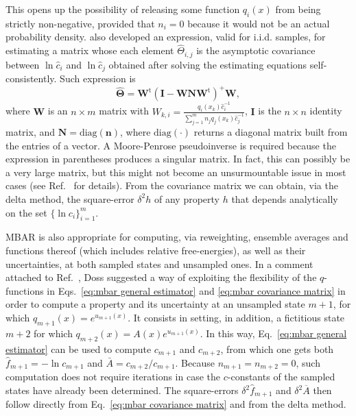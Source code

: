 \documentclass[journal=jctcce,manuscript=article]{achemso}
\newcommand{\mt}[1]{\boldsymbol{\mathbf{#1}}}   %
\newcommand{\vt}[1]{\boldsymbol{\mathbf{#1}}}   %
\newcommand{\tr}[1]{#1^\text{t}}                %
\newcommand{\avg}[1]{\overline{#1}}             %
\begin{document}
This opens up the possibility of releasing some function $q_i(x)$ from being strictly non-negative, provided that $n_i = 0$ because it would not be an actual probability density. \citeauthor{Kong_2003} \cite{Kong_2003} also developed an expression, valid for i.i.d. samples, for estimating a matrix whose each element $\hat \Theta_{i,j}$ is the asymptotic covariance between $\ln \hat c_i$ and $\ln \hat c_j$ obtained after solving the estimating equations self-consistently. Such expression is
\begin{equation}
\label{eq:mbar covariance matrix}
\hat{\mt \Theta} = \tr{\mt W} (\mt I - {\mt W}{\mt N}\tr{\mt W})^+  {\mt W},
\end{equation}
where $\mt W$ is an $n \times m$ matrix with $W_{k,i} = \frac{q_i(x_k) \hat c_i^{-1}}{\sum_{j=1}^m n_j q_j(x_k) \hat c_j^{-1}}$, $\mt I$ is the $n \times n$ identity matrix, and $\mt N = \text{diag}(\vt n)$, where $\text{diag}(\cdot)$ returns a diagonal matrix built from the entries of a vector. A Moore-Penrose pseudoinverse is required because the expression in parentheses produces a singular matrix. In fact, this can possibly be a very large matrix, but this might not become an unsurmountable issue in most cases (see Ref.~ for details). From the covariance matrix we can obtain, via the delta method, the square-error $\delta^2 h$ of any property $h$ that depends analytically on the set $\{\ln c_i\}_{i=1}^m$.

MBAR is also appropriate for computing, via reweighting, ensemble averages and functions thereof (which includes relative free-energies), as well as their uncertainties, at both sampled states and unsampled ones. In a comment attached to Ref.~, Doss suggested a way of exploiting the flexibility of the $q$-functions in Eqs.~\eqref{eq:mbar general estimator} and \eqref{eq:mbar covariance matrix} in order to compute a property and its uncertainty at an unsampled state $m+1$, for which $q_{m+1}(x) = e^{u_{m+1}(x)}$. It consists in setting, in addition, a fictitious state $m+2$ for which $q_{m+2}(x) = A(x)e^{u_{m+1}(x)}$. In this way, Eq.~\eqref{eq:mbar general estimator} can be used to compute $c_{m+1}$ and $c_{m+2}$, from which one gets both $\hat f_{m+1} = -\ln c_{m+1}$ and $\bar A = {c_{m+2}}/{c_{m+1}}$. Because $n_{m+1} = n_{m+2} = 0$, such computation does not require iterations in case the $c$-constants of the sampled states have already been determined. The square-errors $\delta^2 \hat f_{m+1}$ and $\delta^2 \avg A$ then follow directly from Eq.~\eqref{eq:mbar covariance matrix} and from the delta method.
\end{document}
